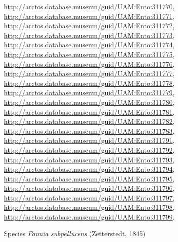 \documentclass[9pt, article]{memoir}
\begin{document}
\begin{multicols}{2}
\url{http://arctos.database.museum/guid/UAM:Ento:311770}, 
\url{http://arctos.database.museum/guid/UAM:Ento:311771}, 
\url{http://arctos.database.museum/guid/UAM:Ento:311772}, 
\url{http://arctos.database.museum/guid/UAM:Ento:311773}, 
\url{http://arctos.database.museum/guid/UAM:Ento:311774}, 
\url{http://arctos.database.museum/guid/UAM:Ento:311775}, 
\url{http://arctos.database.museum/guid/UAM:Ento:311776}, 
\url{http://arctos.database.museum/guid/UAM:Ento:311777}, 
\url{http://arctos.database.museum/guid/UAM:Ento:311778}, 
\url{http://arctos.database.museum/guid/UAM:Ento:311779}, 
\url{http://arctos.database.museum/guid/UAM:Ento:311780}, 
\url{http://arctos.database.museum/guid/UAM:Ento:311781}, 
\url{http://arctos.database.museum/guid/UAM:Ento:311782}, 
\url{http://arctos.database.museum/guid/UAM:Ento:311783}, 
\url{http://arctos.database.museum/guid/UAM:Ento:311791}, 
\url{http://arctos.database.museum/guid/UAM:Ento:311792}, 
\url{http://arctos.database.museum/guid/UAM:Ento:311793}, 
\url{http://arctos.database.museum/guid/UAM:Ento:311794}, 
\url{http://arctos.database.museum/guid/UAM:Ento:311795}, 
\url{http://arctos.database.museum/guid/UAM:Ento:311796}, 
\url{http://arctos.database.museum/guid/UAM:Ento:311797}, 
\url{http://arctos.database.museum/guid/UAM:Ento:311798}, 
\url{http://arctos.database.museum/guid/UAM:Ento:311799}.

\vspace{6pt}\noindent\hspace{36pt}Species \textit{Fannia subpellucens} (Zetterstedt, 1845)



\end{multicols}
\end{document}
